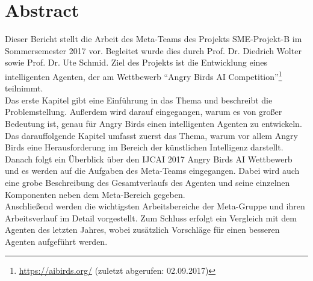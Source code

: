 \section{Abstract}
Dieser Bericht stellt die Arbeit des Meta-Teams des Projekts SME-Projekt-B im Sommersemester 2017 vor. Begleitet wurde dies durch Prof. Dr. Diedrich Wolter sowie Prof. Dr. Ute Schmid. Ziel des Projekts ist die Entwicklung eines intelligenten Agenten, der am Wettbewerb ``Angry Birds AI Competition''\footnote{\url{https://aibirds.org/} (zuletzt abgerufen: 02.09.2017)} teilnimmt. \\
Das erste Kapitel gibt eine Einführung in das Thema und beschreibt die Problemstellung. Au\ss erdem wird darauf eingegangen, warum es von gro\ss er Bedeutung ist, genau für Angry Birds einen intelligenten Agenten zu entwickeln. \\
Das darauffolgende Kapitel umfasst zuerst das Thema, warum vor allem Angry Birds eine Herausforderung im Bereich der künstlichen Intelligenz darstellt. Danach folgt ein Überblick über den IJCAI 2017 Angry Birds AI Wettbewerb und es werden auf die Aufgaben des Meta-Teams eingegangen. Dabei wird auch eine grobe Beschreibung des Gesamtverlaufs des Agenten und seine einzelnen Komponenten neben dem Meta-Bereich gegeben. \\
Anschließend werden die wichtigsten Arbeitsbereiche der Meta-Gruppe und ihren Arbeitsverlauf im Detail vorgestellt.
Zum Schluss erfolgt ein Vergleich mit dem Agenten des letzten Jahres, wobei zusätzlich Vorschläge für einen besseren Agenten aufgeführt werden.
